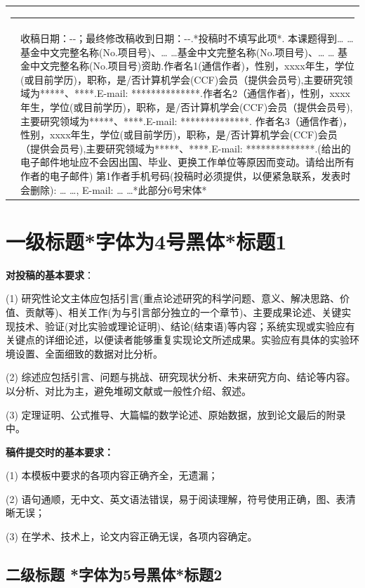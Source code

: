 \documentclass[10.5pt,compsoc]{CjC}
\theoremstyle{mystyle}
\begin{document}
\begin{table}[!t]
	\setlength{\tabcolsep}{2pt}
	\begin{tabular}{p{0.05cm}p{16.15cm}}
		\multicolumn{2}{l}{\rule[4mm]{40mm}{0.1mm}}\\[-3mm]
		&
		收稿日期：\quad \quad -\quad -\quad ；最终修改稿收到日期：\quad \quad -\quad -\quad .*投稿时不填写此项*. 本课题得到… …基金中文完整名称(No.项目号)、… …基金中文完整名称(No.项目号)、… … 基金中文完整名称(No.项目号)资助.作者名1(通信作者)，性别，xxxx年生，学位(或目前学历)，职称，是/否计算机学会(CCF)会员（提供会员号),主要研究领域为*****、****.E-mail: **************.作者名2（通信作者)，性别，xxxx年生，学位(或目前学历)，职称，是/否计算机学会(CCF)会员（提供会员号),主要研究领域为*****、****.E-mail: **************. 作者名3（通信作者)，性别，xxxx年生，学位(或目前学历)，职称，是/否计算机学会(CCF)会员（提供会员号),主要研究领域为*****、****.E-mail: **************.(给出的电子邮件地址应不会因出国、毕业、更换工作单位等原因而变动。请给出所有作者的电子邮件)
		第1作者手机号码(投稿时必须提供，以便紧急联系，发表时会删除): … …, E-mail: … …*此部分6号宋体*
	\end{tabular}
\end{table}
\clearpage

\linespread{1.15}
\vskip 1mm
\section{一级标题*字体为4号黑体*标题1}
\textbf{对投稿的基本要求}：

(1) 研究性论文主体应包括引言(重点论述研究的科学问题、意义、解决思路、价值、贡献等)、相关工作(为与引言部分独立的一个章节)、主要成果论述、关键实现技术、验证(对比实验或理论证明)、结论(结束语)等内容；系统实现或实验应有关键点的详细论述，以便读者能够重复实现论文所述成果。实验应有具体的实验环境设置、全面细致的数据对比分析。

(2) 综述应包括引言、问题与挑战、研究现状分析、未来研究方向、结论等内容。以分析、对比为主，避免堆砌文献或一般性介绍、叙述。

(3) 定理证明、公式推导、大篇幅的数学论述、原始数据，放到论文最后的附录中。

{\bf 稿件提交时的基本要求：}

(1) 本模板中要求的各项内容正确齐全，无遗漏；

(2) 语句通顺，无中文、英文语法错误，易于阅读理解，符号使用正确，图、表清晰无误；

(3) 在学术、技术上，论文内容正确无误，各项内容确定。

\subsection{二级标题 *字体为5号黑体*标题2}
\end{document}
